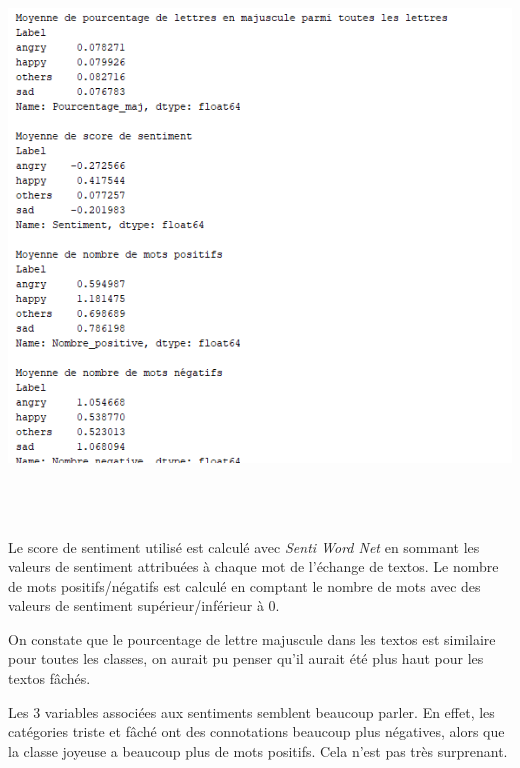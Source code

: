 \includegraphics[width=\linewidth,height=15cm,keepaspectratio]{images/analyse_maj_sentiment}

Le score de sentiment utilisé est calculé avec \emph{Senti Word Net} en sommant les valeurs de sentiment attribuées à chaque mot de l'échange de textos. Le nombre de mots positifs/négatifs est calculé en comptant le nombre de mots avec des valeurs de sentiment supérieur/inférieur à 0.

On constate que le pourcentage de lettre majuscule dans les textos est similaire pour toutes les classes, on aurait pu penser qu'il aurait été plus haut pour les textos fâchés. 

Les 3 variables associées aux sentiments semblent beaucoup parler. En effet, les catégories triste et fâché ont des connotations beaucoup plus négatives, alors que la classe joyeuse a beaucoup plus de mots positifs. Cela n'est pas très surprenant.